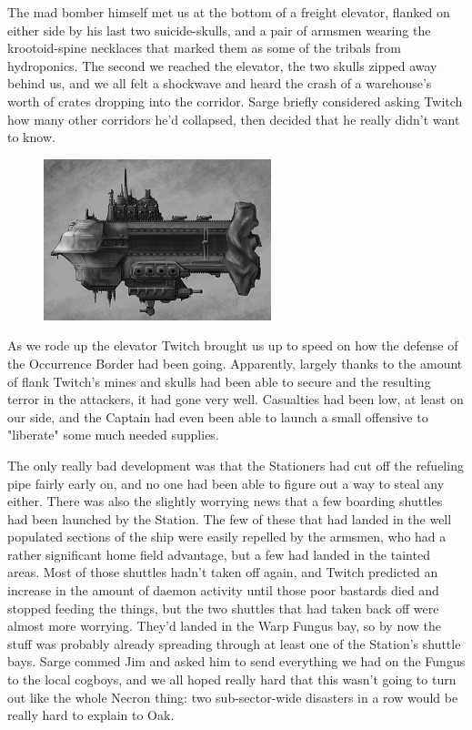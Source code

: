 The mad bomber himself met us at the bottom of a freight elevator, flanked on either side by his last two suicide-skulls, and a pair of armsmen wearing the krootoid-spine necklaces that marked them as some of the tribals from hydroponics. 
The second we reached the elevator, the two skulls zipped away behind us, and we all felt a shockwave and heard the crash of a warehouse's worth of crates dropping into the corridor. 
Sarge briefly considered asking Twitch how many other corridors he'd collapsed, then decided that he really didn't want to know.

\begin{figure}
	\begin{center}
		\includegraphics[width=\figwidth]{pics/14/48.png}
	\end{center}
\end{figure}
As we rode up the elevator Twitch brought us up to speed on how the defense of the Occurrence Border had been going. 
Apparently, largely thanks to the amount of flank Twitch's mines and skulls had been able to secure and the resulting terror in the attackers, it had gone very well. 
Casualties had been low, at least on our side, and the Captain had even been able to launch a small offensive to "liberate" some much needed supplies.

The only really bad development was that the Stationers had cut off the refueling pipe fairly early on, and no one had been able to figure out a way to steal any either. 
There was also the slightly worrying news that a few boarding shuttles had been launched by the Station. 
The few of these that had landed in the well populated sections of the ship were easily repelled by the armsmen, who had a rather significant home field advantage, but a few had landed in the tainted areas. 
Most of those shuttles hadn't taken off again, and Twitch predicted an increase in the amount of daemon activity until those poor bastards died and stopped feeding the things, but the two shuttles that had taken back off were almost more worrying. 
They'd landed in the Warp Fungus bay, so by now the stuff was probably already spreading through at least one of the Station's shuttle bays. 
Sarge commed Jim and asked him to send everything we had on the Fungus to the local cogboys, and we all hoped really hard that this wasn't going to turn out like the whole Necron thing: 
two sub-sector-wide disasters in a row would be really hard to explain to Oak.

